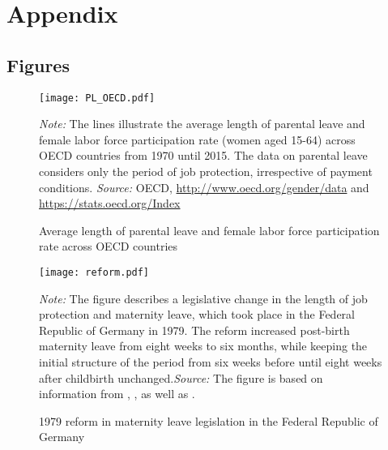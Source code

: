 \documentclass[a4paper ]{article}
\begin{document}
 


\newpage




\newpage
\appendix
\section{Appendix}
\subsection{Figures}
\renewcommand\thefigure{A\arabic{figure}}
\setcounter{figure}{0} 
\captionsetup[subfigure]{labelformat=parens}






\begin{figure}[p]
\centering
\texttt{[image: PL\_OECD.pdf]}
\caption{Average length of parental leave and female labor force participation rate across OECD countries}
\label{fig:PLOECD}
\begin{minipage}{\textwidth} %
{\footnotesize \textit{Note:} The lines illustrate the average length of parental leave and female labor force participation rate (women aged 15-64) across OECD countries from 1970 until 2015. The data on parental leave considers only the period of job protection, irrespective of payment conditions. \newline \textit{Source: }OECD, 
\href{http://www.oecd.org/gender/data/length-of-maternity-leave-parental-leave-and-paid-father-specific-leave.htm}{http://www.oecd.org/gender/data} and \href{https://stats.oecd.org/Index.aspx?DataSetCode=LFS_SEXAGE_I_R#}{https://stats.oecd.org/Index}\par}
\end{minipage}
\end{figure}



\begin{figure}[p]
\centering 
\texttt{[image: reform.pdf]}
\caption{1979 reform in maternity leave legislation in the Federal Republic of Germany}\label{fig: MLreform}
\begin{minipage}{\textwidth} 
{\footnotesize \textit{Note:} The figure describes a legislative change in the length of job protection and maternity leave, which took place in the Federal Republic of Germany in 1979. The reform increased post-birth maternity leave from eight weeks to six months, while keeping the initial structure of the period from six weeks before until eight weeks after childbirth unchanged.\newline \textit{Source: }The figure is based on information from \cite{dustmann2012expansions}, \cite{DIW2002}, \cite{schonberg2014expansions} as well as \cite{zmarzlik1999mutterschutzgesetz}.\par}
\end{minipage}
\end{figure}
\end{document}
